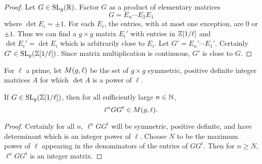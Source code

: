 \documentclass{amsart}
\begin{document}
\begin{proof}
  Let $G \in \operatorname{SL}_g(\mathbb{R})$. Factor $G$ as a product of elementary matrices
  \[
    G = E_n \cdots E_2 E_1
  \]
  where $\det E_i = \pm 1$. For each $E_i$, the entries, with at most one exception, are $0$ or $\pm 1$. Thus we can find a $g \times g$ matrix $E_i'$ with entries in $\mathbb{Z}[1/\ell]$ and $\det E_i' = \det E_i$ which is arbitrarily close to $E_i$. Let $G' = E_n' \cdots E_1'$. Certainly $G' \in \operatorname{SL}_g(\mathbb{Z}[1/\ell])$. Since matrix multiplication is continuous, $G'$ is close to $G$.
\end{proof}




\begin{definition}\label{def:detl}
  For $\ell$ a prime, let $M(g,\ell)$ be the set of $g \times g$ symmetric, positive definite integer matrices $A$ for which $\det A$ is a power of $\ell$.
\end{definition}

\begin{lemma}\label{lemma:ggt-spd-detl}
  If $G \in \operatorname{SL}_g(\mathbb{Z}[1/\ell])$, then for all sufficiently large $n \in \mathbb{N}$,
  \[
    \ell^n GG^t \in M(g,\ell).
  \]
\end{lemma}

\begin{proof}
  Certainly for all $n$, $\ell^n GG^t$ will be symmetric, positive definite, and have determinant which is an integer power of $\ell$. Choose $N$ to be the maximum power of $\ell$ appearing in the denominators of the entries of $GG^t$. Then for $n \geq N$, $\ell^n GG^t$ is an integer matrix.
\end{proof}
\end{document}
